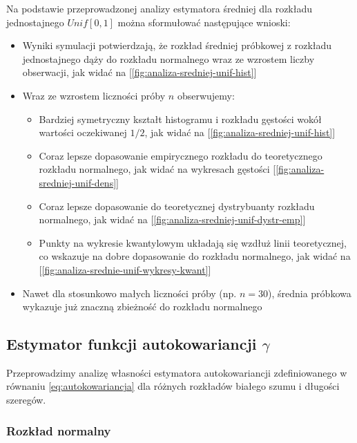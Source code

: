 \documentclass[10pt, a4paper]{article}\usepackage[]{graphicx}\usepackage[]{xcolor}
\begin{document}
Na podstawie przeprowadzonej analizy estymatora średniej dla rozkładu jednostajnego $Unif[0,1]$ można sformułować następujące wnioski:

\begin{itemize}
    \item Wyniki symulacji potwierdzają, że rozkład średniej próbkowej z rozkładu jednostajnego dąży do rozkładu normalnego wraz ze wzrostem liczby obserwacji, jak widać na [\ref{fig:analiza-sredniej-unif-hist}]
    \item Wraz ze wzrostem liczności próby $n$ obserwujemy:
    \begin{itemize}
        \item Bardziej symetryczny kształt histogramu i rozkładu gęstości wokół wartości oczekiwanej $1/2$, jak widać na [\ref{fig:analiza-sredniej-unif-hist}]
        \item Coraz lepsze dopasowanie empirycznego rozkładu do teoretycznego rozkładu normalnego, jak widać na wykresach gęstości [\ref{fig:analiza-sredniej-unif-dens}]    
        \item Coraz lepsze dopasowanie do teoretycznej dystrybuanty rozkładu normalnego, jak widać na [\ref{fig:analiza-sredniej-unif-dystr-emp}]
        \item Punkty na wykresie kwantylowym układają się wzdłuż linii teoretycznej, co wskazuje na dobre dopasowanie do rozkładu normalnego, jak widać na [\ref{fig:analiza-srednie-unif-wykresy-kwant}]
        \end{itemize}
    \item Nawet dla stosunkowo małych liczności próby (np. $n = 30$), średnia próbkowa wykazuje już znaczną zbieżność do rozkładu normalnego
\end{itemize}





\subsection{Estymator funkcji autokowariancji $\gamma$}
Przeprowadzimy analizę własności estymatora autokowariancji zdefiniowanego w równaniu \eqref{eq:autokowariancja} dla różnych rozkładów białego szumu i długości szeregów.

\newpage
\subsubsection{Rozkład normalny}
\end{document}
